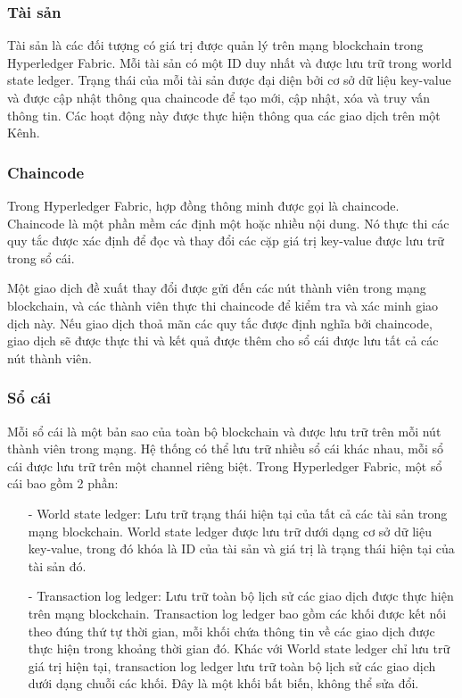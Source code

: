 \subsubsection{Tài sản}
Tài sản là các đối tượng có giá trị được quản lý trên mạng blockchain trong 
Hyperledger Fabric. Mỗi tài sản có một ID duy nhất và được lưu trữ trong world state 
ledger. Trạng thái của mỗi tài sản được đại diện bởi cơ sở dữ liệu key-value và 
được cập nhật thông qua chaincode để tạo mới, cập nhật, xóa và truy vấn thông tin.
Các hoạt động này được thực hiện thông qua các giao dịch trên một Kênh.
\subsubsection{Chaincode}

Trong Hyperledger Fabric, hợp đồng thông minh được gọi là chaincode. Chaincode là 
một phần mềm các định một hoặc nhiều nội dung. Nó thực thi các quy tắc được xác định
để đọc và thay đổi các cặp giá trị key-value được lưu trữ trong sổ cái. 

Một giao dịch đề xuất thay đổi được gửi đến các nút thành viên trong mạng blockchain, và các 
thành viên thực thi chaincode để kiểm tra và xác minh giao dịch này. Nếu giao dịch thoả mãn các quy 
tắc được định nghĩa bởi chaincode, giao dịch sẽ được thực thi và kết 
quả được thêm cho sổ cái được lưu tất cả các nút thành viên.

\subsubsection{Sổ cái}
Mỗi sổ cái là một bản sao của toàn bộ blockchain và được lưu trữ trên mỗi nút thành viên trong mạng.
Hệ thống có thể lưu trữ nhiều sổ cái khác nhau, mỗi sổ cái được lưu trữ trên một channel riêng biệt. 
Trong Hyperledger Fabric, một sổ cái bao gồm 2 phần:

\begin{itemize}
    \item[-] World state ledger: Lưu trữ trạng thái hiện tại của tất cả các 
    tài sản trong mạng blockchain. World state ledger được lưu trữ dưới dạng cơ sở dữ liệu key-value, trong đó khóa là ID của tài sản và giá trị là trạng thái hiện tại của tài sản đó.
    \item[-] Transaction log ledger: Lưu trữ toàn bộ lịch sử các giao dịch được thực hiện 
    trên mạng blockchain. Transaction log ledger bao gồm các khối được kết nối theo đúng 
    thứ tự thời gian, mỗi khối chứa thông tin về các giao dịch được thực hiện trong khoảng 
    thời gian đó. Khác với World state ledger chỉ lưu trữ giá trị hiện tại, transaction log ledger
    lưu trữ toàn bộ lịch sử các giao dịch dưới dạng chuỗi các khối. Đây là
    một khối bất biến, không thể sửa đổi.
\end{itemize}
